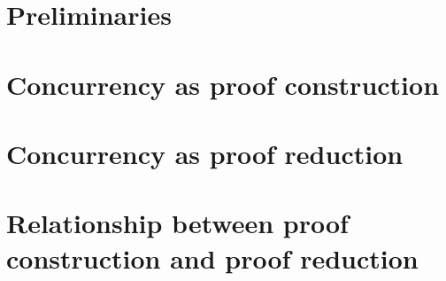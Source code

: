 \documentclass[
  tufte-book,
  notoc,
  biblatex={
    citestyle=authoryear-comp,
    autocite=footnote,
    maxcitenames=3,
    bibstyle=authoryear,
    mergedate=basic,
    maxbibnames=99,
    backref=true,
    doi=false,
    isbn=false,
  }
]{tufte-thesis}
\begin{document}
\mainmatter




\part{Preliminaries}\label{part:preliminaries}




 \part{Concurrency as proof construction}\label{part:proof-construction}



% 

% 


\part{Concurrency as proof reduction}\label{part:proof-reduction}




\part{Relationship between proof construction and proof reduction}\label{part:comparison}




\appendix



\backmatter

\printbibliography
\end{document}
